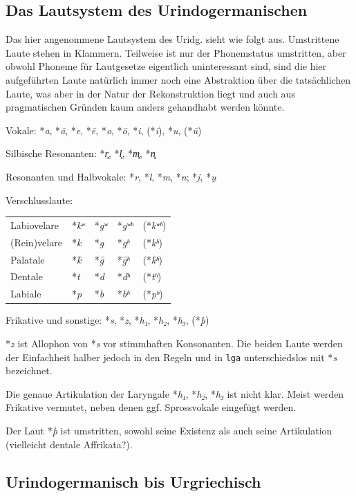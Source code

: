 \documentclass[12pt,a4paper,normalheadings,bibliography=totoc]{scrartcl}
\def\rek#1{\mbox{*\textit{#1}}}
\def\tt#1{\texttt{#1}}
\begin{document}
\newpage
\subsection{Das Lautsystem des Urindogermanischen}

Das hier angenommene Lautsystem des Uridg. sieht wie folgt aus.
Umstrittene Laute stehen in Klammern.
Teilweise ist nur der Phonemstatus umstritten,
aber obwohl Phoneme für Lautgesetze eigentlich uninteressant sind,
sind die hier aufgeführten Laute natürlich immer noch
eine Abstraktion über die tatsächlichen Laute,
was aber in der Natur der Rekonstruktion liegt
und auch aus pragmatischen Gründen kaum anders gehandhabt werden könnte.

\bigskip
\noindent
Vokale: \rek{a}, \rek{ā}, \rek{e}, \rek{ē}, \rek{o}, \rek{ō},
\rek{i}, (\rek{ī}), \rek{u}, (\rek{ū})

\noindent
Silbische Resonanten: \rek{r̥}, \rek{l̥}, \rek{m̥}, \rek{n̥}

\noindent
Resonanten und Halbvokale: \rek{r}, \rek{l}, \rek{m}, \rek{n}; \rek{i̯}, \rek{u̯}

\noindent
Verschlusslaute:\\
\begin{tabular}{l l l l l}
Labiovelare & \rek{kʷ} & \rek{gʷ} & \rek{gʷʰ} & (\rek{kʷʰ})\\
(Rein)velare & \rek{k} & \rek{g} & \rek{gʰ} & (\rek{kʰ})\\
Palatale & \rek{k̑} & \rek{g̑} & \rek{g̑ʰ} & (\rek{k̑ʰ})\\
Dentale & \rek{t} & \rek{d} & \rek{dʰ} & (\rek{tʰ})\\
Labiale & \rek{p} & \rek{b} & \rek{bʰ} & (\rek{pʰ})\\
\end{tabular}

\noindent
Frikative und sonstige: \rek{s}, \rek{z}, \rek{h₁}, \rek{h₂}, \rek{h₃}, (\rek{þ})

\bigskip
\rek{z} ist Allophon von \rek{s} vor stimmhaften Konsonanten.
Die beiden Laute werden der Einfachheit halber
jedoch in den Regeln und in \tt{lga}
unterschiedslos mit \rek{s} bezeichnet.

Die genaue Artikulation der Laryngale \rek{h₁}, \rek{h₂}, \rek{h₃}
ist nicht klar. Meist werden Frikative vermutet,
neben denen ggf. Sprossvokale eingefügt werden.

Der Laut \rek{þ} ist umstritten,
sowohl seine Existenz als auch seine Artikulation
(vielleicht dentale Affrikata?).

\subsection{Urindogermanisch bis Urgriechisch}
\end{document}
